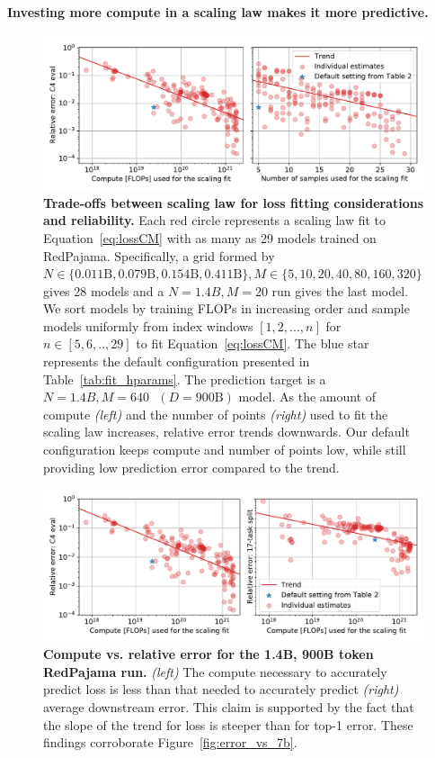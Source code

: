 \begin{appendix}
\paragraph{Investing more compute in a scaling law makes it more predictive.}

\begin{figure}[t!]
    \centering
    \includegraphics[width=0.98\linewidth]{figs/error_vs.pdf}
    \caption{\textbf{Trade-offs between scaling law for loss fitting considerations and reliability.} Each red circle represents a scaling law fit to Equation~\eqref{eq:lossCM} with as many as 29 models trained on RedPajama. Specifically, a grid formed by $N \in \{0.011\text{B}, 0.079\text{B}, 0.154\text{B}, 0.411\text{B}\}, M \in \{5, 10, 20, 40, 80, 160, 320\}$ gives 28 models and a $N=1.4B, M=20$ run gives the last model.
    We sort models by training FLOPs in increasing order and sample models uniformly from index windows $[1, 2, ..., n]$ for $n \in [5, 6, .., 29]$ to fit Equation~\eqref{eq:lossCM}.
    The blue star represents the default configuration presented in Table~\ref{tab:fit_hparams}. The prediction target is a $N=1.4B, M=640\text{ }(D=900\text{B})$ model. As the amount of compute \emph{(left)} and the number of points \emph{(right)} used to fit the scaling law increases, relative error trends downwards. Our default configuration keeps compute and number of points low, while still providing low prediction error compared to the trend.}
    \label{fig:error_vs}
\end{figure}

\begin{figure}
    \centering
    \includegraphics[width=0.98\linewidth]{figs/error_vs_1b.pdf}
    \caption{
    \textbf{Compute vs. relative error for the 1.4B, 900B token RedPajama run.}
    \emph{(left)} The compute necessary to accurately predict loss is less than that needed to accurately predict \emph{(right)} average downstream error.
    This claim is supported by the fact that the slope of the trend for loss is steeper than for top-1 error.
    These findings corroborate Figure~\ref{fig:error_vs_7b}.
    }
    \label{fig:error_vs_1b}
\end{figure}


\end{appendix}
